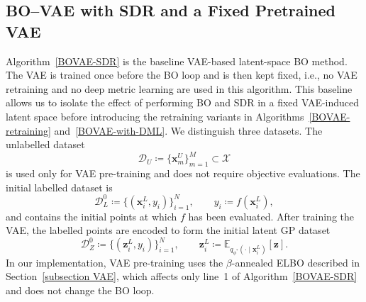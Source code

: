 \documentclass[pdflatex,sn-mathphys-num]{sn-jnl}%
\theoremstyle{thmstyleone}%
\theoremstyle{thmstyletwo}%
\theoremstyle{thmstylethree}%
\begin{document}
\subsection{BO--VAE with SDR and a Fixed Pretrained VAE}
Algorithm~\ref{BOVAE-SDR} is the baseline VAE-based latent-space BO method. The VAE is trained once before the BO loop and is then kept fixed, i.e., no VAE retraining and no deep metric learning are used in this algorithm. This baseline allows us to isolate the effect of performing BO and SDR in a fixed VAE-induced latent space before introducing the retraining variants in Algorithms~\ref{BOVAE-retraining} and~\ref{BOVAE-with-DML}. We distinguish three datasets. The unlabelled dataset
\[
    \mathcal D_U \coloneq \{\mathbf{x}_m^U\}_{m=1}^M \subset \mathcal X
\]
is used only for VAE pre-training and does not require objective evaluations. The initial labelled dataset is
\[
    \mathcal D_L^0
    \coloneq
    \{(\mathbf{x}_i^L,y_i)\}_{i=1}^N,
    \qquad
    y_i \coloneq f(\mathbf{x}_i^L),
\]
and contains the initial points at which \(f\) has been evaluated. After training the VAE, the labelled points are encoded to form the initial latent GP dataset
\[
    \mathcal D_Z^0
    \coloneq
    \{(\mathbf{z}_i^L,y_i)\}_{i=1}^N,
    \qquad
    \mathbf{z}_i^L
    \coloneq
    \mathbb E_{q_{\phi^\ast}(\cdot\mid \mathbf{x}_i^L)}[\mathbf z].
\]
In our implementation, VAE pre-training uses the \(\beta\)-annealed ELBO described in Section~\ref{subsection VAE}, which affects only line~1 of Algorithm~\ref{BOVAE-SDR} and does not change the BO loop.
\end{document}
